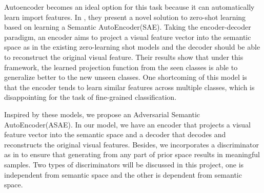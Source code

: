 \documentclass{article}
\begin{document}
Autoencoder becomes an ideal option for this task because it can automatically learn import features. In \cite{kodirov2017semantic}, they present a novel solution to zero-shot learning based on learning a Semantic AutoEncoder(SAE). Taking the encoder-decoder paradigm, an encoder aims to project a visual feature vector into the semantic space as in the existing zero-learning shot models and the decoder should be able to reconstruct the original visual feature. Their results show that under this framework, the learned projection function from the seen classes is able to generalize better to the new unseen classes. One shortcoming of this model is that the encoder tends to learn similar features across multiple classes, which is disappointing for the task of fine-grained classification. 

Inspired by these models, we propose an Adversarial Semantic AutoEncoder(ASAE). In our model, we have an encoder that projects a visual feature vector into the semantic space and a decoder that decodes and reconstructs the original visual features. Besides, we incorporates a discriminator as in \cite{makhzani2015adversarial} to ensure that generating from any part of prior space results in meaningful samples. Two types of discriminators will be discussed in this project, one is independent from semantic space and the other is dependent from semantic space. 





\end{document}
